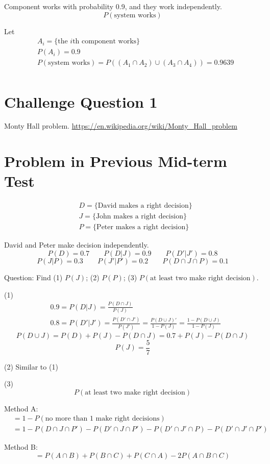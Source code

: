 \begin{exmp}
Component works with probability 0.9, and they work independently.
\[P(\text{system works})\]
\begin{solution}	
Let
\begin{align*}
&A_i=\{ \text{the }i\text{th component works} \}	\\
&P(A_i)=0.9	\\
&P(\text{system works})=P\left( (A_1 \cap A_2)\cup(A_3 \cap A_4) \right)=0.9639\\
\end{align*}
\end{solution}
\end{exmp}

\section{Challenge Question 1}
Monty Hall problem. \url{https://en.wikipedia.org/wiki/Monty_Hall_problem}


\section{Problem in Previous Mid-term Test}
 \begin{exmp}
 \begin{align*}
   &D=\{\text{David makes a right decision}\}	\\
   &J=\{\text{John makes a right decision}\}	\\
   &P=\{\text{Peter makes a right decision}\}	
 \end{align*}

David and Peter make decision independently.
  \[  P(D) = 0.7 \qquad P(D|J)=0.9 \qquad P(D'|J')=0.8  \]
  \[  P(J|P)=0.3 \qquad P(J'|P')=0.2 \qquad P(D \cap J\cap P)=0.1 \]

  Question: Find
  (1) $P(J)$; 
  (2) $P(P)$; 
  (3) $P(\text{at least two make right decision})$.
\end{exmp}

\begin{solution}
  (1)
  \begin{align*}
  &0.9=P(D|J)=\frac{P(D \cap J)}{P(J)}  \\
  &0.8=P(D'|J')=\frac{P(D'\cap J')}{P(J')}=\frac{P(D\cup J)'}{1-P(J)}=\frac{1-P(D\cup J)}{1-P(J)}
  \end{align*}
  \[P(D\cup J)=P(D)+P(J)-P(D \cap J)=0.7+P(J)-P(D \cap J)\]
  \[P(J)=\frac{5}{7}\]

  (2) Similar to (1)

  (3)
  \[P(\text{at least two make right decision})\]
  
Method A:
\begin{align*}
  &=1-P(\text{no more than 1 make right decisions})\\
  &=1-P(D \cap J \cap P')-P(D' \cap J \cap P')-P(D' \cap J' \cap P)-P(D' \cap J' \cap P')
\end{align*}

Method B:
\[ =P(A \cap B)+P(B \cap C) + P(C \cap A)-2 P(A\cap B \cap C)\]
\end{solution}